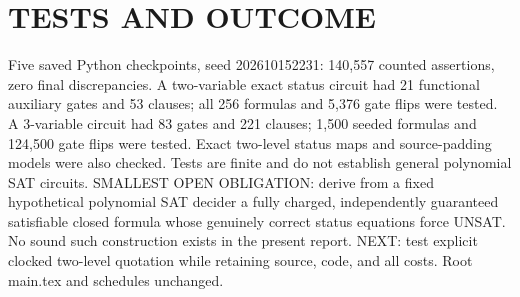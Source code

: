 \documentclass{article}
\begin{document}
\section{TESTS AND OUTCOME}
Five saved Python checkpoints, seed 202610152231: 140,557 counted assertions, zero final discrepancies. A two-variable exact status circuit had 21 functional auxiliary gates and 53 clauses; all 256 formulas and 5,376 gate flips were tested. A 3-variable circuit had 83 gates and 221 clauses; 1,500 seeded formulas and 124,500 gate flips were tested. Exact two-level status maps and source-padding models were also checked. Tests are finite and do not establish general polynomial SAT circuits.
SMALLEST OPEN OBLIGATION: derive from a fixed hypothetical polynomial SAT decider a fully charged, independently guaranteed satisfiable closed formula whose genuinely correct status equations force UNSAT. No sound such construction exists in the present report. NEXT: test explicit clocked two-level quotation while retaining source, code, and all costs. Root main.tex and schedules unchanged.
\end{document}
